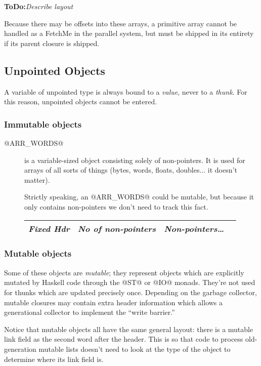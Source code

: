\documentclass[11pt]{article}
\newcommand{\ToDo}[1]{{{\bf ToDo:}\sl #1}}
\newcommand{\Subsection}[2]{\subsection{#1}\label{sec:#2}}
\begin{document}
\ToDo{Describe layout}

Because there may be offsets into these arrays, a primitive array
cannot be handled as a FetchMe in the parallel system, but must be
shipped in its entirety if its parent closure is shipped.



\Subsection{Unpointed Objects}{unpointed-objects}

A variable of unpointed type is always bound to a \emph{value}, never
to a \emph{thunk}.  For this reason, unpointed objects cannot be
entered.

\subsubsection{Immutable objects}
\label{sec:ARR_WORDS}

\begin{description}
\item[@ARR\_WORDS@] is a variable-sized object consisting solely of
non-pointers.  It is used for arrays of all sorts of things (bytes,
words, floats, doubles... it doesn't matter).

Strictly speaking, an @ARR_WORDS@ could be mutable, but because it
only contains non-pointers we don't need to track this fact.

\begin{center}
\begin{tabular}{|c|c|c|c|}
\hline
\emph{Fixed Hdr} & \emph{No of non-pointers} & \emph{Non-pointers\ldots}	\\ \hline
\end{tabular}
\end{center}
\end{description}

\subsubsection{Mutable objects}
\label{sec:mutables}
\label{sec:MUT_VAR}
\label{sec:MUT_ARR_PTRS}
\label{sec:MUT_ARR_PTRS_FROZEN}
\label{sec:MVAR}

Some of these objects are \emph{mutable}; they represent objects which
are explicitly mutated by Haskell code through the @ST@ or @IO@
monads.  They're not used for thunks which are updated precisely once.
Depending on the garbage collector, mutable closures may contain extra
header information which allows a generational collector to implement
the ``write barrier.''

Notice that mutable objects all have the same general layout: there is
a mutable link field as the second word after the header.  This is so
that code to process old-generation mutable lists doesn't need to look
at the type of the object to determine where its link field is.
\end{document}

